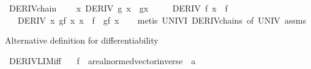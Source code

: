 \begin{isabellebody}
\endisatagproof
{\isafoldproof}%
%
\isadelimproof
\isanewline
%
\endisadelimproof
\isanewline
{}\isamarkupfalse%
\ DERIV{\isacharunderscore}{\kern0pt}chain{}{\isacharcolon}{\kern0pt}\ \isanewline
\ \ \ {\isachardoublequoteopen}{\isacharparenleft}{\kern0pt}{\isasymAnd}x{\isachardot}{\kern0pt}\ DERIV\ g\ x\ {\isacharcolon}{\kern0pt}{\isachargreater}{\kern0pt}\ g{\isacharprime}{\kern0pt}{\isacharparenleft}{\kern0pt}x{\isacharparenright}{\kern0pt}{\isacharparenright}{\kern0pt}{\isachardoublequoteclose}\isanewline
\ \ \ \ \ {\isachardoublequoteopen}DERIV\ f\ x\ {\isacharcolon}{\kern0pt}{\isachargreater}{\kern0pt}\ f{\isacharprime}{\kern0pt}{\isachardoublequoteclose}\isanewline
\ \ \ {\isachardoublequoteopen}DERIV\ {\isacharparenleft}{\kern0pt}{\isasymlambda}x{\isachardot}{\kern0pt}\ g{\isacharparenleft}{\kern0pt}f\ x{\isacharparenright}{\kern0pt}{\isacharparenright}{\kern0pt}\ x\ {\isacharcolon}{\kern0pt}{\isachargreater}{\kern0pt}\ f{\isacharprime}{\kern0pt}\ {\isacharasterisk}{\kern0pt}\ g{\isacharprime}{\kern0pt}{\isacharparenleft}{\kern0pt}f\ x{\isacharparenright}{\kern0pt}{\isachardoublequoteclose}\isanewline
%
\isadelimproof
\ \ %
\endisadelimproof
%
\isatagproof
{}\isamarkupfalse%
\ {\isacharparenleft}{\kern0pt}metis\ UNIV{\isacharunderscore}{\kern0pt}I\ DERIV{\isacharunderscore}{\kern0pt}chain{\isacharunderscore}{\kern0pt}s\ {\isacharbrackleft}{\kern0pt}of\ UNIV{\isacharbrackright}{\kern0pt}\ assms{\isacharparenright}{\kern0pt}%
\endisatagproof
{\isafoldproof}%
%
\isadelimproof
%
\endisadelimproof
%
\begin{isamarkuptext}%
Alternative definition for differentiability%
\end{isamarkuptext}\isamarkuptrue%
\isamarkupfalse%
\ DERIV{\isacharunderscore}{\kern0pt}LIM{\isacharunderscore}{\kern0pt}iff{\isacharcolon}{\kern0pt}\isanewline
\ \ \ f\ {\isacharcolon}{\kern0pt}{\isacharcolon}{\kern0pt}\ {\isachardoublequoteopen}{\isacharprime}{\kern0pt}a{\isacharcolon}{\kern0pt}{\isacharcolon}{\kern0pt}{\isacharbraceleft}{\kern0pt}real{\isacharunderscore}{\kern0pt}normed{\isacharunderscore}{\kern0pt}vector{\isacharcomma}{\kern0pt}inverse{\isacharbraceright}{\kern0pt}\ {\isasymRightarrow}\ {\isacharprime}{\kern0pt}a{\isachardoublequoteclose}\isanewline

\end{isabellebody}
